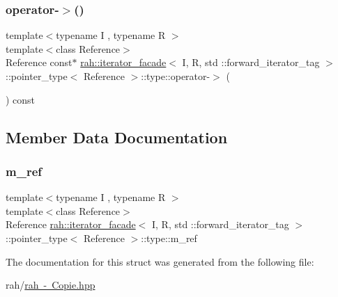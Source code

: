 \subsubsection{\texorpdfstring{operator-\/$>$()}{operator->()}}
{\footnotesize\ttfamily template$<$typename I , typename R $>$ \\
template$<$class Reference$>$ \\
Reference const$\ast$ \mbox{\hyperlink{structrah_1_1iterator__facade}{rah\+::iterator\+\_\+facade}}$<$ I, R, std \+::forward\+\_\+iterator\+\_\+tag $>$\+::pointer\+\_\+type$<$ Reference $>$\+::type\+::operator-\/$>$ (\begin{DoxyParamCaption}{ }\end{DoxyParamCaption}) const\hspace{0.3cm}{\ttfamily [inline]}}



\subsection{Member Data Documentation}
\mbox{\label{structrah_1_1iterator__facade_3_01_i_00_01_r_00_01std_01_1_1forward__iterator__tag_01_4_1_1pointer__type_1_1type_a41af4fce18669376c37ebb84ca7de727}} 
\subsubsection{\texorpdfstring{m\_ref}{m\_ref}}
{\footnotesize\ttfamily template$<$typename I , typename R $>$ \\
template$<$class Reference$>$ \\
Reference \mbox{\hyperlink{structrah_1_1iterator__facade}{rah\+::iterator\+\_\+facade}}$<$ I, R, std \+::forward\+\_\+iterator\+\_\+tag $>$\+::pointer\+\_\+type$<$ Reference $>$\+::type\+::m\+\_\+ref}



The documentation for this struct was generated from the following file\+:\begin{DoxyCompactItemize}
\item 
rah/\mbox{\hyperlink{rah_01-_01_copie_8hpp}{rah -\/ Copie.\+hpp}}\end{DoxyCompactItemize}
